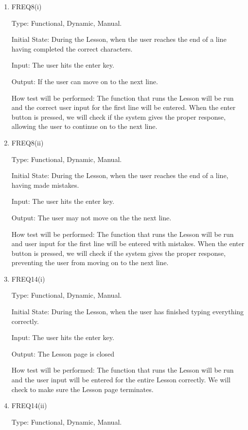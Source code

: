 \documentclass[12pt, titlepage]{article}
\begin{document}
\begin{enumerate}
\item{FREQ8(i)\\}

{\color{cyan}Type: Functional, Dynamic, Manual.
					
Initial State: During the Lesson, when the user reaches the end of a line having completed the correct characters.
					
Input: The user hits the enter key.
					
Output: If the user can move on to the next line.
					
How test will be performed: The function that runs the Lesson will be run and the correct user input for the first line will be entered. When the enter button is pressed, we will check if the system gives the proper response, allowing the user to continue on to the next line.}

\item{FREQ8(ii)}
{\color{cyan}
Type: Functional, Dynamic, Manual.
					
Initial State: During the Lesson, when the user reaches the end of a line, having made mistakes.
					
Input: The user hits the enter key.
					
Output: The user may not move on the the next line.
					
How test will be performed: The function that runs the Lesson will be run and user input for the first line will be entered with mistakes. When the enter button is pressed, we will check if the system gives the proper response, preventing the user from moving on to the next line.}

\item{FREQ14(i)\\}
{\color{cyan}
Type: Functional, Dynamic, Manual.
					
Initial State: During the Lesson, when the user has finished typing everything correctly.
					
Input: The user hits the enter key.
					
Output: The Lesson page is closed
					
How test will be performed: The function that runs the Lesson will be run and the user input will be entered for the entire Lesson correctly. We will check to make sure the Lesson page terminates.}

\item{FREQ14(ii)\\}
{\color{cyan}
Type: Functional, Dynamic, Manual.
					
}
\end{enumerate}
\end{document}
